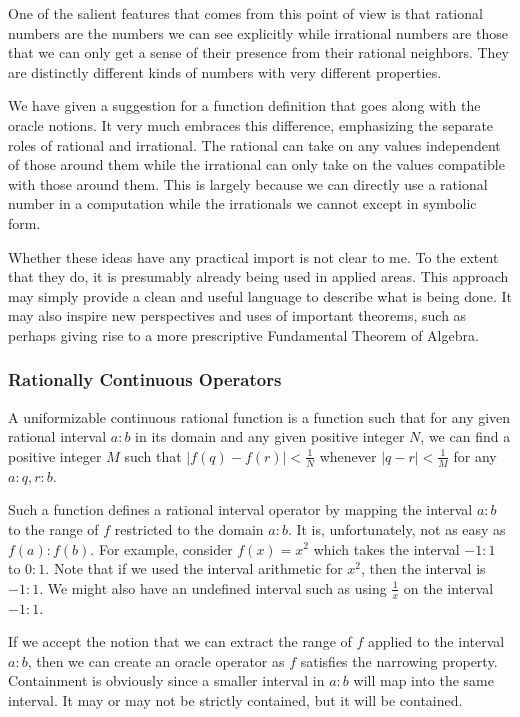 One of the salient features that comes from this point of view is that rational numbers are the numbers we can see explicitly while irrational numbers are those that we can only get a sense of their presence from their rational neighbors. They are distinctly different kinds of numbers with very different properties. 

We have given a suggestion for a function definition that goes along with the oracle notions. It very much embraces this difference, emphasizing the separate roles of rational and irrational. The rational can take on any values independent of those around them while the irrational can only take on the values compatible with those around them. This is largely because we can directly use a rational number in a computation while the irrationals we cannot except in symbolic form. 

Whether these ideas have any practical import is not clear to me. To the extent that they do, it is presumably already being used in applied areas. This approach may simply provide a clean and useful language to describe what is being done. It may also inspire new perspectives and uses of important theorems, such as perhaps giving rise to a more prescriptive Fundamental Theorem of Algebra. 



\subsubsection{Rationally Continuous Operators}

A uniformizable continuous rational function is a function such that for any given rational interval $a:b$ in its domain and any given positive integer $N$, we can find a positive integer $M$ such that $|f(q) - f(r)| < \frac{1}{N} $ whenever $|q-r| < \frac{1}{M}$ for any $a:q,r:b$. 

Such a function defines a rational interval operator by mapping the interval $a:b$ to the range of $f$ restricted to the domain $a:b$. It is, unfortunately, not as easy as $f(a):f(b)$. For example, consider $f(x) = x^2$ which takes the interval $-1:1$ to $0:1$. Note that if we used the interval arithmetic for $x^2$, then the interval is $-1:1$. We might also have an undefined interval such as using $\frac{1}{x}$ on the interval $-1:1$.

If we accept the notion that we can extract the range of $f$ applied to the interval $a:b$, then we can create an oracle operator as $f$ satisfies the narrowing property. Containment is obviously since a smaller interval in $a:b$ will map into the same interval. It may or may not be strictly contained, but it will be contained. 


